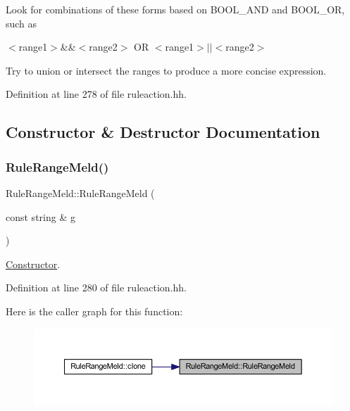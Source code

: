 Look for combinations of these forms based on B\+O\+O\+L\+\_\+\+A\+ND and B\+O\+O\+L\+\_\+\+OR, such as

$<$range1$>$\&\&$<$range2$>$ OR $<$range1$>$$\vert$$\vert$$<$range2$>$

Try to union or intersect the ranges to produce a more concise expression. 

Definition at line 278 of file ruleaction.\+hh.



\subsection{Constructor \& Destructor Documentation}
\mbox{\label{class_rule_range_meld_ac9e65abb14b028184a0c917db181314d}} 
\subsubsection{\texorpdfstring{RuleRangeMeld()}{RuleRangeMeld()}}
{\footnotesize\ttfamily Rule\+Range\+Meld\+::\+Rule\+Range\+Meld (\begin{DoxyParamCaption}\item[{const string \&}]{g }\end{DoxyParamCaption})\hspace{0.3cm}{\ttfamily [inline]}}



\mbox{\hyperlink{class_constructor}{Constructor}}. 



Definition at line 280 of file ruleaction.\+hh.

Here is the caller graph for this function\+:
\nopagebreak
\begin{figure}[H]
\begin{center}
\leavevmode
\includegraphics[width=350pt]{class_rule_range_meld_ac9e65abb14b028184a0c917db181314d_icgraph}
\end{center}
\end{figure}


